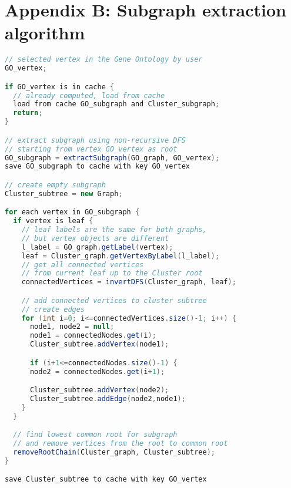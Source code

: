 \section*{Appendix B: Subgraph extraction algorithm}
\label{sec:appendix_B}

\begin{center}
\small
\begin{lstlisting}[language=Java]
// selected vertex in the Gene Ontology by user
GO_vertex;

if GO_vertex is in cache {
  // already computed, load from cache
  load from cache GO_subgraph and Cluster_subgraph;
  return;
}

// extract subgraph using non-recursive DFS
// starting from vertex GO_vertex as root
GO_subgraph = extractSubgraph(GO_graph, GO_vertex);
save GO_subgraph to cache with key GO_vertex

// create empty subgraph
Cluster_subtree = new Graph;

for each vertex in GO_subgraph {
  if vertex is leaf {
    // leaf labels are the same for both graphs,
    // but vertex objects are different
    l_label = GO_graph.getLabel(vertex);
    leaf = Cluster_graph.getVertexByLabel(l_label);
    // get all connected vertices
    // from current leaf up to the Cluster root
    connectedVertices = invertDFS(Cluster_graph, leaf);

    // add connected vertices to cluster subtree
    // create edges
    for (int i=0; i<=connectedVertices.size()-1; i++) {
      node1, node2 = null;
      node1 = connectedNodes.get(i);
      Cluster_subtree.addVertex(node1);

      if (i+1<=connectedNodes.size()-1) {
      node2 = connectedNodes.get(i+1);

      Cluster_subtree.addVertex(node2);
      Cluster_subtree.addEdge(node2,node1);
    }
  }

  // find lowest common root for subgraph
  // and remove vertices from the root to common root
  removeRootChain(Cluster_graph, Cluster_subtree);
}

save Cluster_subtree to cache with key GO_vertex
\end{lstlisting}
\end{center}